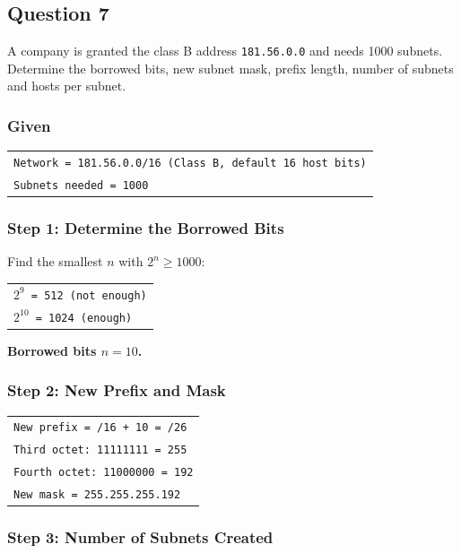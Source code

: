 \documentclass[11pt,a4paper]{article}
\begin{document}
\subsection*{Question 7}

A company is granted the class B address \texttt{181.56.0.0} and needs 1000 subnets. Determine
the borrowed bits, new subnet mask, prefix length, number of subnets and hosts per subnet.

\subsubsection*{Given}

\begin{tabularx}{\textwidth}{@{}X@{}}
\texttt{Network = 181.56.0.0/16 (Class B, default 16 host bits)} \\
\texttt{Subnets needed = 1000} \\
\end{tabularx}

\subsubsection*{Step 1: Determine the Borrowed Bits}

Find the smallest $n$ with $2^{n} \ge 1000$:

\begin{tabularx}{\textwidth}{@{}X@{}}
\texttt{$2^{9}$ = 512 (not enough)} \\
\texttt{$2^{10}$ = 1024 (enough)} \\
\end{tabularx}

\textbf{Borrowed bits $n = 10$.}

\subsubsection*{Step 2: New Prefix and Mask}

\begin{tabularx}{\textwidth}{@{}X@{}}
\texttt{New prefix = /16 + 10 = /26} \\
\texttt{Third octet: 11111111 = 255} \\
\texttt{Fourth octet: 11000000 = 192} \\
\texttt{New mask = 255.255.255.192} \\
\end{tabularx}

\subsubsection*{Step 3: Number of Subnets Created}
\end{document}
